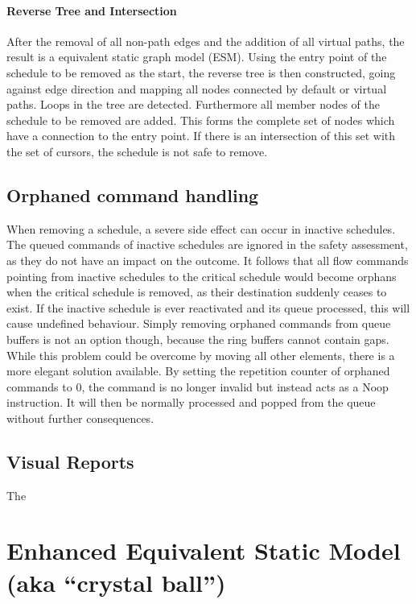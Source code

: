 \paragraph{Reverse Tree and Intersection}
After the removal of all non-path edges and the addition of all virtual paths, the result is a equivalent static graph model (ESM). Using the entry point of the schedule to be removed as the start,
the reverse tree is then constructed, going against edge direction and mapping all nodes connected by default or virtual paths. Loops in the tree are detected. Furthermore all member nodes of the schedule to be removed are added. This forms the complete set of nodes which have a connection to the entry point. If there is an intersection of this set with the set of cursors, the schedule is not safe to remove.

\subsection{Orphaned command handling}
When removing a schedule, a severe side effect can occur in inactive schedules. The queued commands of inactive schedules are ignored in the safety assessment, as they do not have an impact on the outcome. It follows that all flow commands pointing from inactive schedules to the critical schedule would become orphans when the critical schedule is removed, as their destination suddenly ceases to exist. If the inactive schedule is ever reactivated and its queue processed, this will cause undefined behaviour. Simply removing orphaned commands from queue buffers is not an option though, because the ring buffers cannot contain gaps. While this problem could be overcome by moving all other elements, there is a more elegant solution available. By setting the repetition counter of orphaned commands to 0, the command is no longer invalid but instead acts as a Noop instruction. It will then be normally processed and popped from the queue without further consequences.


\subsection{Visual Reports}
The


\section{Enhanced Equivalent Static Model\\(aka \enquote{crystal ball})}
\label{sec:eesm}
